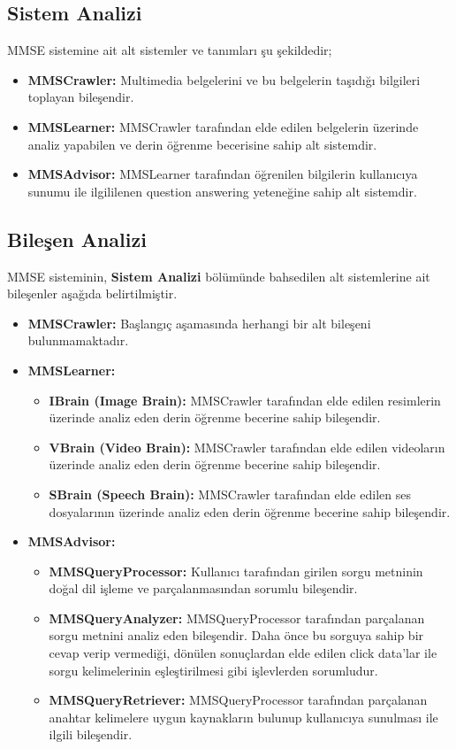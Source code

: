 \documentclass[11pt,a4paper]{article}
\begin{document}
\subsection{Sistem Analizi}
MMSE sistemine ait alt sistemler ve tanımları şu şekildedir;
\begin{itemize}
\item \textbf{MMSCrawler:} Multimedia belgelerini ve bu belgelerin taşıdığı bilgileri toplayan bileşendir.
\item \textbf{MMSLearner:} MMSCrawler tarafından elde edilen belgelerin üzerinde analiz yapabilen ve derin öğrenme becerisine sahip alt sistemdir.
\item \textbf{MMSAdvisor:} MMSLearner tarafından öğrenilen bilgilerin kullanıcıya sunumu ile ilgililenen question answering yeteneğine sahip alt sistemdir.
\end{itemize}

\subsection{Bileşen Analizi}
MMSE sisteminin, \textbf{Sistem Analizi} bölümünde bahsedilen alt sistemlerine ait bileşenler aşağıda belirtilmiştir.

\begin{itemize}
\item \textbf{MMSCrawler:} Başlangıç aşamasında herhangi bir alt bileşeni bulunmamaktadır.
\item \textbf{MMSLearner:}
\begin{itemize}
\item \textbf{IBrain (Image Brain):} MMSCrawler tarafından elde edilen resimlerin üzerinde analiz eden derin öğrenme becerine sahip bileşendir.
\item \textbf{VBrain (Video Brain):} MMSCrawler tarafından elde edilen videoların üzerinde analiz eden derin öğrenme becerine sahip bileşendir.
\item \textbf{SBrain (Speech Brain):} MMSCrawler tarafından elde edilen ses dosyalarının üzerinde analiz eden derin öğrenme becerine sahip bileşendir.
\end{itemize}
\item \textbf{MMSAdvisor:}
\begin{itemize}
\item \textbf{MMSQueryProcessor:} Kullanıcı tarafından girilen sorgu metninin doğal dil işleme ve parçalanmasından sorumlu bileşendir.
\item \textbf{MMSQueryAnalyzer:} MMSQueryProcessor tarafından parçalanan sorgu metnini analiz eden bileşendir. Daha önce bu sorguya sahip bir cevap verip vermediği, dönülen sonuçlardan elde edilen click data'lar ile sorgu kelimelerinin eşleştirilmesi gibi işlevlerden sorumludur.
\item \textbf{MMSQueryRetriever:} MMSQueryProcessor tarafından parçalanan anahtar kelimelere uygun kaynakların bulunup kullanıcıya sunulması ile ilgili bileşendir.
\end{itemize}
  
\end{itemize}
\end{document}
